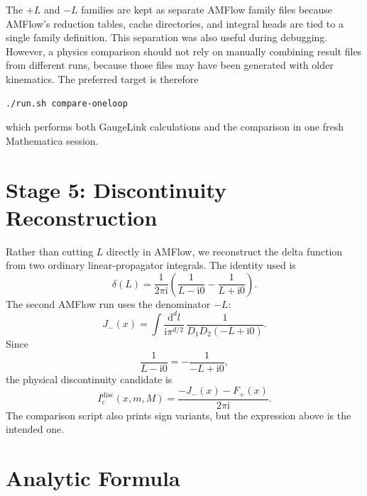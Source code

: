 \documentclass[11pt]{article}
\newcommand{\dd}{\mathrm{d}}
\newcommand{\ii}{\mathrm{i}}
\begin{document}
The \(+L\) and \(-L\) families are kept as separate AMFlow family files because
AMFlow's reduction tables, cache directories, and integral heads are tied to a
single family definition. This separation was also useful during debugging.
However, a physics comparison should not rely on manually combining result
files from different runs, because those files may have been generated with
older kinematics. The preferred target is therefore
\begin{verbatim}
./run.sh compare-oneloop
\end{verbatim}
which performs both GaugeLink calculations and the comparison in one fresh
Mathematica session.

\section{Stage 5: Discontinuity Reconstruction}

Rather than cutting \(L\) directly in AMFlow, we reconstruct the delta function
from two ordinary linear-propagator integrals. The identity used is
\begin{equation}
  \delta(L)
  =
  \frac{1}{2\pi \ii}
  \left(
    \frac{1}{L-\ii0}
    -
    \frac{1}{L+\ii0}
  \right).
\end{equation}
The second AMFlow run uses the denominator \(-L\):
\begin{equation}
  J_-(x)
  =
  \int \frac{\dd^d l}{\ii \pi^{d/2}}\,
  \frac{1}{D_1D_2(-L+\ii0)}.
\end{equation}
Since
\begin{equation}
  \frac{1}{L-\ii0}=-\frac{1}{-L+\ii0},
\end{equation}
the physical discontinuity candidate is
\begin{equation}
  I_c^{\mathrm{disc}}(x,m,M)
  =
  \frac{-J_-(x)-F_+(x)}{2\pi\ii}.
\end{equation}
The comparison script also prints sign variants, but the expression above is
the intended one.

\section{Analytic Formula}
\end{document}
